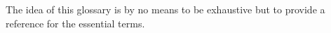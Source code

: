 The idea of this glossary is by no means to be exhaustive but to provide a reference for the essential terms.